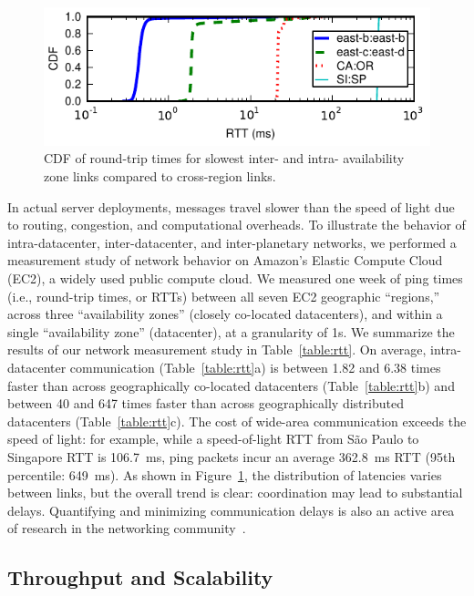 \begin{figure}[t!]
\includegraphics[width=\figscale\columnwidth]{figs/ping-plot.pdf}\vspace{.5em}
\caption{CDF of round-trip times for slowest inter- and intra-
  availability zone links compared to cross-region links.}
\label{fig:rtt}
\end{figure}

In actual server deployments, messages travel slower than the speed of
light due to routing, congestion, and computational overheads. To
illustrate the behavior of intra-datacenter, inter-datacenter, and
inter-planetary networks, we performed a measurement study of network
behavior on Amazon's Elastic Compute Cloud (EC2), a widely used public
compute cloud. We measured one week of ping times (i.e., round-trip
times, or RTTs) between all seven EC2 geographic ``regions,'' across
three ``availability zones'' (closely co-located datacenters), and
within a single ``availability zone'' (datacenter), at a granularity
of 1s. We summarize the results of our network measurement study in
Table~\ref{table:rtt}. On average, intra-datacenter communication
(Table~\ref{table:rtt}a) is between 1.82 and 6.38 times faster than
across geographically co-located datacenters (Table~\ref{table:rtt}b)
and between 40 and 647 times faster than across geographically
distributed datacenters (Table~\ref{table:rtt}c). The cost of
wide-area communication exceeds the speed of light: for example, while
a speed-of-light RTT from S\~{a}o Paulo to Singapore RTT is 106.7~ms,
ping packets incur an average 362.8~ms RTT (95th percentile: 649~ms). As
shown in Figure~\ref{fig:rtt}, the distribution of latencies varies
between links, but the overall trend is clear: coordination may lead
to substantial delays. Quantifying and minimizing communication delays
is also an active area of research in the networking
community~\cite{bobtail}.

\subsection{Throughput and Scalability}
\label{sec:background-cmotivation}

